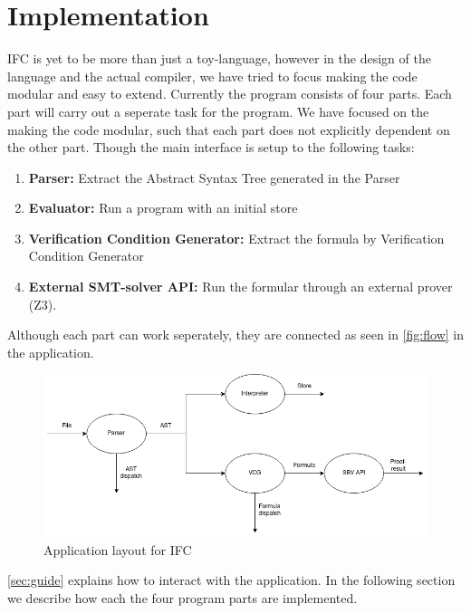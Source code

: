 \section{Implementation}\label{sec:implementation}
IFC is yet to be more than just a toy-language, however in the design of the language and the actual compiler, we have tried to focus making the code modular and easy to extend.
Currently the program consists of four parts. Each part will carry out a seperate task for the program. We have focused on the making the code modular, such that each part does not explicitly dependent on the other part. Though the main interface is setup to the following tasks:
\begin{enumerate}
  \item \textbf{Parser:} Extract the Abstract Syntax Tree generated in the Parser
  \item \textbf{Evaluator:} Run a program with an initial store
  \item \textbf{Verification Condition Generator:} Extract the formula by Verification Condition Generator
  \item \textbf{External SMT-solver API:} Run the formular through an external prover (Z3).
\end{enumerate}
Although each part can work seperately, they are connected as seen in \autoref{fig:flow} in the application.

\begin{figure}[h]
  \includegraphics[width=\linewidth]{Implementation/IFCflow.png}
  \caption{Application layout for IFC}
  \label{fig:flow}
\end{figure}

\autoref{sec:guide} explains how to interact with the application. In the following section we describe how each the four program parts are implemented.





